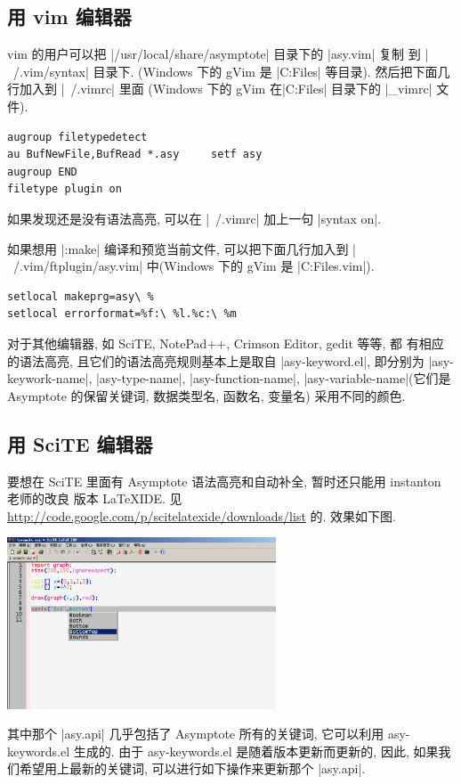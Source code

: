 \documentclass[nofonts,CJKnormalspaces]{ctexbook}
\begin{document}
\subsection{用 vim 编辑器}
vim 的用户可以把 |/usr/local/share/asymptote| 目录下的 |asy.vim| 复制
到 |~/.vim/syntax| 目录下. (Windows 下的 gVim 是
|C:\Program Files\Vim\vimfiles\syntax| 等目录). 然后把下面几行加入到
|~/.vimrc| 里面 (Windows 下的 gVim 在|C:\Program Files\Vim| 目录下的
|_vimrc| 文件).
\begin{verbatim}
augroup filetypedetect
au BufNewFile,BufRead *.asy     setf asy
augroup END
filetype plugin on
\end{verbatim}
如果发现还是没有语法高亮, 可以在 |~/.vimrc| 加上一句 |syntax on|.

如果想用 |:make| 编译和预览当前文件, 可以把下面几行加入到
|~/.vim/ftplugin/asy.vim| 中(Windows 下的 gVim 是
|C:\Program Files\Vim\vimfiles\ftplugin\asy.vim|).
\begin{verbatim}
setlocal makeprg=asy\ %
setlocal errorformat=%f:\ %l.%c:\ %m
\end{verbatim}

对于其他编辑器, 如 SciTE, NotePad++, Crimson Editor, gedit 等等, 都
有相应的语法高亮, 且它们的语法高亮规则基本上是取自 |asy-keyword.el|,
即分别为 |asy-keywork-name|, |asy-type-name|, |asy-function-name|,
|asy-variable-name|(它们是 Asymptote 的保留关键词, 数据类型名, 函数名,
变量名) 采用不同的颜色.

\subsection{用 SciTE 编辑器}
要想在 SciTE 里面有 Asymptote 语法高亮和自动补全, 暂时还只能用 instanton 老师的改良
版本 LaTeXIDE. 见
\url{http://code.google.com/p/scitelatexide/downloads/list}
的. 效果如下图.
\begin{center}
  \includegraphics[width=0.6\textwidth]{SciTE.png}
\end{center}
其中那个 |asy.api| 几乎包括了 Asymptote 所有的关键词, 它可以利用
asy-keywords.el 生成的. 由于 asy-keywords.el 是随着版本更新而更新的,
因此, 如果我们希望用上最新的关键词, 可以进行如下操作来更新那个
|asy.api|.
\end{document}
